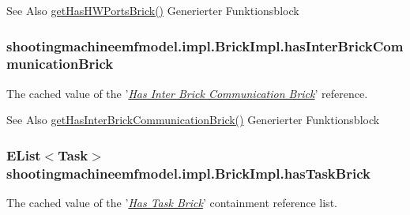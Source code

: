 \begin{DoxySeeAlso}{See Also}
\hyperlink{classshootingmachineemfmodel_1_1impl_1_1_brick_impl_aab300b09314059764d15304583bebebb}{get\-Has\-H\-W\-Ports\-Brick()} Generierter Funktionsblock  
\end{DoxySeeAlso}
\hypertarget{classshootingmachineemfmodel_1_1impl_1_1_brick_impl_a23bf733c1d11dffe70e782aa69d5b1d4}{
\subsubsection[{has\-Inter\-Brick\-Communication\-Brick}]{ shootingmachineemfmodel.\-impl.\-Brick\-Impl.\-has\-Inter\-Brick\-Communication\-Brick\hspace{0.3cm}{\ttfamily [protected]}}}\label{classshootingmachineemfmodel_1_1impl_1_1_brick_impl_a23bf733c1d11dffe70e782aa69d5b1d4}
The cached value of the '\hyperlink{classshootingmachineemfmodel_1_1impl_1_1_brick_impl_aca43b282e7e1c127e521f51f9dbb7e38}{{\itshape Has Inter Brick Communication Brick}}' reference.

\begin{DoxySeeAlso}{See Also}
\hyperlink{classshootingmachineemfmodel_1_1impl_1_1_brick_impl_aca43b282e7e1c127e521f51f9dbb7e38}{get\-Has\-Inter\-Brick\-Communication\-Brick()} Generierter Funktionsblock  
\end{DoxySeeAlso}
\hypertarget{classshootingmachineemfmodel_1_1impl_1_1_brick_impl_ad74e2edddf418ebc84b4b86103c990f7}{
\subsubsection[{has\-Task\-Brick}]{\setlength{\rightskip}{0pt plus 5cm}E\-List$<${\bf Task}$>$ shootingmachineemfmodel.\-impl.\-Brick\-Impl.\-has\-Task\-Brick\hspace{0.3cm}{\ttfamily [protected]}}}\label{classshootingmachineemfmodel_1_1impl_1_1_brick_impl_ad74e2edddf418ebc84b4b86103c990f7}
The cached value of the '\hyperlink{classshootingmachineemfmodel_1_1impl_1_1_brick_impl_a31e7ecea8f97c7c733ba4ecf8589efc5}{{\itshape Has Task Brick}}' containment reference list.

